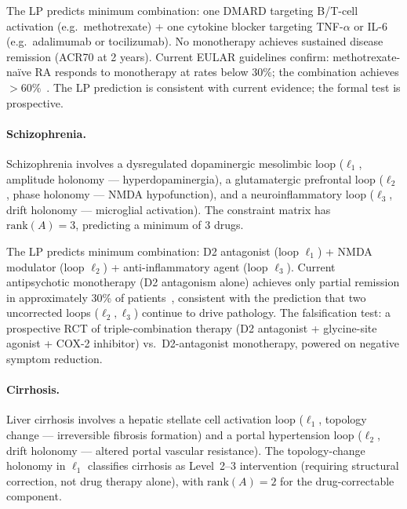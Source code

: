 \begin{prediction}
\label{pred:ch11-ra}
The LP predicts minimum combination: one DMARD targeting B/T-cell activation
(e.g.\ methotrexate) + one cytokine blocker targeting TNF-$\alpha$ or IL-6
(e.g.\ adalimumab or tocilizumab).  No monotherapy achieves sustained disease
remission (ACR70 at 2 years).  Current EULAR guidelines confirm:
methotrexate-na\"{i}ve RA responds to monotherapy at rates below 30\%; the
combination achieves $> 60\%$~\citep{Smolen2020}.  The LP prediction is
consistent with current evidence; the formal test is prospective.
\end{prediction}

\paragraph{Schizophrenia.}
Schizophrenia involves a dysregulated dopaminergic mesolimbic loop ($\ell_1$,
amplitude holonomy — hyperdopaminergia), a glutamatergic prefrontal loop
($\ell_2$, phase holonomy — NMDA hypofunction), and a neuroinflammatory loop
($\ell_3$, drift holonomy — microglial activation).  The constraint matrix has
$\mathrm{rank}(A) = 3$, predicting a minimum of 3 drugs.

\begin{prediction}[Schizophrenia]
\label{pred:ch11-schizophrenia}
The LP predicts minimum combination: D2 antagonist (loop $\ell_1$) + NMDA
modulator (loop $\ell_2$) + anti-inflammatory agent (loop $\ell_3$).  Current
antipsychotic monotherapy (D2 antagonism alone) achieves only partial remission
in approximately 30\% of patients~\citep{Leucht2017}, consistent with the
prediction that two uncorrected loops ($\ell_2, \ell_3$) continue to drive
pathology.  The falsification test: a prospective RCT of triple-combination
therapy (D2 antagonist + glycine-site agonist + COX-2 inhibitor) vs.\
D2-antagonist monotherapy, powered on negative symptom reduction.
\end{prediction}

\paragraph{Cirrhosis.}
Liver cirrhosis involves a hepatic stellate cell activation loop ($\ell_1$,
topology change — irreversible fibrosis formation) and a portal hypertension
loop ($\ell_2$, drift holonomy — altered portal vascular resistance).  The
topology-change holonomy in $\ell_1$ classifies cirrhosis as Level~2--3
intervention (requiring structural correction, not drug therapy alone), with
$\mathrm{rank}(A) = 2$ for the drug-correctable component.

